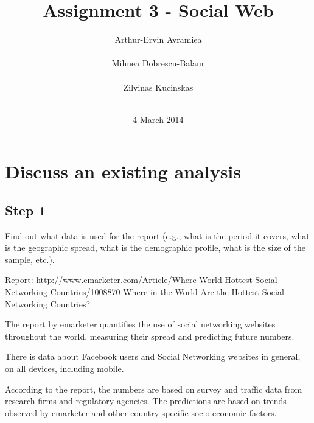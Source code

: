 \documentclass{acm_proc_10ptArticle-sp}
\begin{document}
\title{Assignment 3 - Social Web}

\author{
%
\alignauthor Arthur-Ervin Avramiea\\
       \\
\alignauthor Mihnea Dobrescu-Balaur\\
	\\
\alignauthor Zilvinas Kucinskas\\
	\\
}

\date{4 March 2014}
\maketitle

\section{Discuss an existing analysis}

\subsection{Step 1} 
Find out what data is used for the report (e.g., what is the period it covers, what is the geographic spread, what is the demographic profile, what is the size of the sample, etc.).

Report: http://www.emarketer.com/Article/Where-World-Hottest-Social-Networking-Countries/1008870
Where in the World Are the Hottest Social Networking Countries?

The report by emarketer quantifies the use of social networking websites throughout the world, measuring their spread and predicting future numbers. 

There is data about Facebook users and Social Networking websites in general, on all devices, including mobile.

According to the report, the numbers are based on survey and traffic data from research firms and regulatory agencies. The predictions are based on trends observed by emarketer and other country-specific socio-economic factors.
\end{document}
